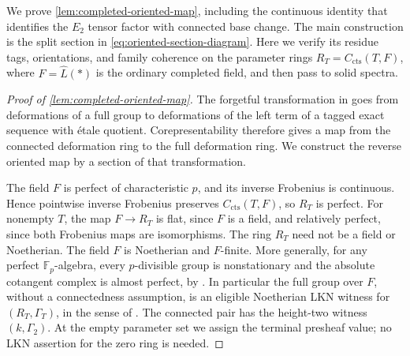 \documentclass[11pt]{article}
\numberwithin{equation}{section}
\theoremstyle{definition}
\theoremstyle{remark}
\newcommand{\F}{\mathbb F}
\newcommand{\cts}{\mathrm{cts}}
\begin{document}
We prove \cref{lem:completed-oriented-map}, including the continuous
identity that identifies the \(E_2\) tensor factor with connected base
change. The main construction is the split section in
\eqref{eq:oriented-section-diagram}. Here we verify its residue tags,
orientations, and family coherence on the parameter rings
\(R_T=C_{\cts}(T,F)\), where \(F=\widehat L(*)\) is the ordinary
completed field, and then pass to solid spectra.

\begin{proof}[Proof of \cref{lem:completed-oriented-map}]
The forgetful transformation in
\cite[Proposition~6.2.2 and Remark~6.2.3]{LurieEllipticII2018} goes from
deformations of a full group to deformations of the left term of a tagged
exact sequence with étale quotient. Corepresentability therefore gives a
map from the connected deformation ring to the full deformation ring.
We construct the reverse oriented map by a section of that transformation.

The field \(F\) is perfect of characteristic \(p\), and its inverse
Frobenius is continuous. Hence pointwise inverse Frobenius preserves
\(C_{\cts}(T,F)\), so \(R_T\) is perfect. For nonempty \(T\), the map
\(F\to R_T\) is flat, since \(F\) is a field, and relatively perfect, since
both Frobenius maps are isomorphisms. The ring \(R_T\) need not be a field
or Noetherian. The field \(F\) is Noetherian and \(F\)-finite.
More generally, for any perfect \(\F_p\)-algebra, every \(p\)-divisible group is nonstationary
and the absolute cotangent complex is almost perfect, by
\cite[Remark~3.4.2]{LurieEllipticII2018}. In particular the full group
over \(F\), without a connectedness assumption, is an eligible
Noetherian LKN witness for \((R_T,\Gamma_T)\), in the sense of
\cite[Definition~4.3.7 and Example~4.6.4]{BMR2026}. The connected pair has
the height-two witness \((k,\Gamma_2)\). At the empty parameter set we
assign the terminal presheaf value; no LKN assertion for the zero ring is
needed.


\end{proof}
\end{document}
